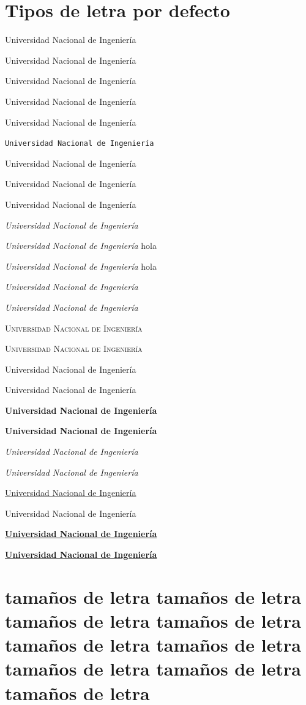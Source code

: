 \documentclass[12pt,a4paper]{article}
\begin{document}
\section{Tipos de letra por defecto}\label{sec1}

Universidad Nacional de Ingeniería

\textrm{Universidad Nacional de Ingeniería}

{\rmfamily Universidad Nacional de Ingeniería}

\textsf{Universidad Nacional de Ingeniería}

{\sffamily Universidad Nacional de Ingeniería}

\texttt{Universidad Nacional de Ingeniería}

{\ttfamily Universidad Nacional de Ingeniería}

\textup{Universidad Nacional de Ingeniería}

{\upshape Universidad Nacional de Ingeniería}

\textit{Universidad Nacional de Ingeniería}

{\itshape Universidad Nacional de Ingeniería} hola

{\itshape Universidad Nacional de Ingeniería\/} hola

\textsl{Universidad Nacional de Ingeniería}

{\slshape Universidad Nacional de Ingeniería}

\textsc{Universidad Nacional de Ingeniería}

{\scshape Universidad Nacional de Ingeniería}

\textmd{Universidad Nacional de Ingeniería}

{\mdseries Universidad Nacional de Ingeniería}

\textbf{Universidad Nacional de Ingeniería}

{\bfseries Universidad Nacional de Ingeniería}

\emph{Universidad Nacional de Ingeniería}

{\em Universidad Nacional de Ingeniería}

\underline{Universidad Nacional de Ingeniería}

{\Huge Universidad Nacional de Ingeniería}

\underline{\textbf{Universidad Nacional de Ingeniería}}

\underline{\bfseries Universidad Nacional de Ingeniería}

\section[tamaño]{tamaños de letra tamaños de letra tamaños de letra tamaños de letra tamaños de letra tamaños de letra tamaños de letra tamaños de letra tamaños de letra}
\end{document}
